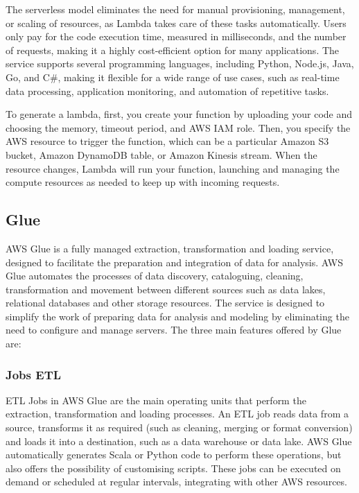 The serverless model eliminates the need for manual provisioning, management, or scaling of resources, as Lambda takes care of these tasks automatically. Users only pay for the code execution time, measured in milliseconds, and the number of requests, making it a highly cost-efficient option for many applications. The service supports several programming languages, including Python, Node.js, Java, Go, and C\#, making it flexible for a wide range of use cases, such as real-time data processing, application monitoring, and automation of repetitive tasks.

To generate a lambda, first, you create your function by uploading your code and choosing the memory, timeout period, and \ac{AWS} \ac{IAM} role. Then, you specify the \ac{AWS} resource to trigger the function, which can be a particular Amazon \ac{S3} bucket, Amazon DynamoDB table, or  Amazon Kinesis stream. When the resource changes, Lambda will run your function, launching and managing the compute resources as needed to keep up with incoming requests.

\subsection{Glue}\label{sec:glue}
\ac{AWS} Glue is a fully managed extraction, transformation and loading service, designed to facilitate the preparation and integration of data for analysis. \ac{AWS} Glue automates the processes of data discovery, cataloguing, cleaning, transformation and movement between different sources such as data lakes, relational databases and other storage resources. The service is designed to simplify the work of preparing data for analysis and modeling by eliminating the need to configure and manage servers. The three main features offered by Glue are:
\subsubsection{Jobs ETL}
\ac{ETL} Jobs in \ac{AWS} Glue are the main operating units that perform the extraction, transformation and loading processes. An \ac{ETL} job reads data from a source, transforms it as required (such as cleaning, merging or format conversion) and loads it into a destination, such as a data warehouse or data lake. \ac{AWS} Glue automatically generates Scala or Python code to perform these operations, but also offers the possibility of customising scripts. These jobs can be executed on demand or scheduled at regular intervals, integrating with other \ac{AWS} resources.
